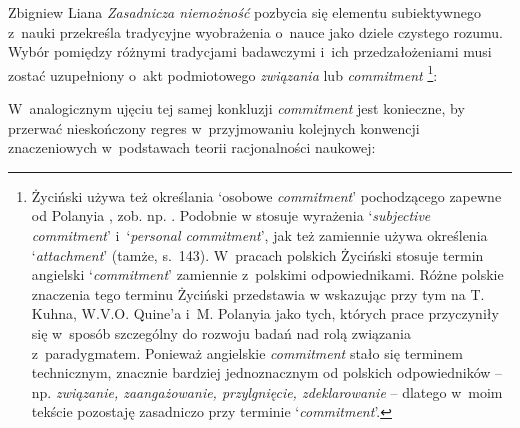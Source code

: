 \begin{artplenv}{Zbigniew Liana}
\textit{Zasadnicza niemożność} pozbycia się elementu subiektywnego z~nauki przekreśla tradycyjne wyobrażenia o~nauce jako dziele czystego rozumu. Wybór pomiędzy różnymi tradycjami badawczymi i~ich przedzałożeniami musi zostać uzupełniony o~akt podmiotowego \textit{związania} lub \textit{commitment}
\parencites[][s.~160]{zycinski_teizm_1985}[][s.~186n.191]{zycinski_elementy_1996}[][s.~253n.258]{zycinski_elementy_2015}%
\footnote{Życiński używa też określania ‘osobowe \textit{commitment}' pochodzącego zapewne od Polanyia 
\parencite*[][]{polanyi_personal_1962}, %
 zob. np. 
\parencite[][s.~79.125.165]{zycinski_teizm_1985}. %
 Podobnie w
\parencite[][s.~137.144]{zycinski_structure_1988} %
 stosuje wyrażenia ‘\textit{subjective commitment}' i~‘\textit{personal commitment}', jak też zamiennie używa określenia ‘\textit{attachment}' (tamże, s.~143). W~pracach polskich Życiński stosuje termin angielski ‘\textit{commitment}' zamiennie z~polskimi odpowiednikami. Różne polskie znaczenia tego terminu Życiński przedstawia w
\parencites[][s.~191]{zycinski_elementy_1996}[][s.~259n]{zycinski_elementy_2015} %
 wskazując przy tym na T. Kuhna, W.V.O. Quine'a i~M. Polanyia jako tych, których prace przyczyniły się w~sposób szczególny do rozwoju badań nad rolą związania z~paradygmatem. Ponieważ angielskie \textit{commitment} stało się terminem technicznym, znacznie bardziej jednoznacznym od polskich odpowiedników -- np. \textit{związanie, zaangażowanie, przylgnięcie, zdeklarowanie} -- dlatego w~moim tekście pozostaję zasadniczo przy terminie ‘\textit{commitment}'.}:



W~analogicznym ujęciu tej samej konkluzji \textit{commitment} jest konieczne, by przerwać nieskończony regres w~przyjmowaniu kolejnych konwencji znaczeniowych w~podstawach teorii racjonalności naukowej:


\end{artplenv}
